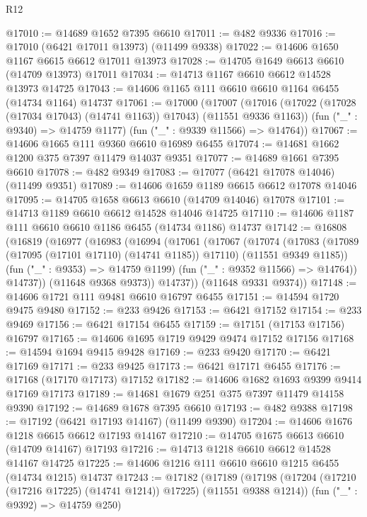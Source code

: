 \begin{lexlean}{R12}
\begin{coremodule}
@17010 := @14689 @1652 @7395 @6610
@17011 := @482 @9336
@17016 := @17010 (@6421 @17011 @13973) (@11499 @9338)
@17022 := @14606 @1650 @1167 @6615 @6612 @17011 @13973
@17028 := @14705 @1649 @6613 @6610 (@14709 @13973) @17011
@17034 := @14713 @1167 @6610 @6612 @14528 @13973 @14725
@17043 := @14606 @1165 @111 @6610 @6610 @1164 @6455 (@14734 @1164) @14737
@17061 := @17000
    (@17007
      (@17016 (@17022 (@17028 (@17034 @17043) (@14741 @1163)) @17043) (@11551 @9336 @1163))
      (fun ("_" : @9340) => @14759 @1177)
      (fun ("_" : @9339 @11566) => @14764))
@17067 := @14606 @1665 @111 @9360 @6610 @16989 @6455
@17074 := @14681 @1662 @1200 @375 @7397 @11479 @14037 @9351
@17077 := @14689 @1661 @7395 @6610
@17078 := @482 @9349
@17083 := @17077 (@6421 @17078 @14046) (@11499 @9351)
@17089 := @14606 @1659 @1189 @6615 @6612 @17078 @14046
@17095 := @14705 @1658 @6613 @6610 (@14709 @14046) @17078
@17101 := @14713 @1189 @6610 @6612 @14528 @14046 @14725
@17110 := @14606 @1187 @111 @6610 @6610 @1186 @6455 (@14734 @1186) @14737
@17142 := @16808
    (@16819
      (@16977
        (@16983
          (@16994
            (@17061
              (@17067
                (@17074
                  (@17083
                    (@17089 (@17095 (@17101 @17110) (@14741 @1185)) @17110)
                    (@11551 @9349 @1185))
                  (fun ("_" : @9353) => @14759 @1199)
                  (fun ("_" : @9352 @11566) => @14764))
                @14737))
            (@11648 @9368 @9373))
          @14737))
      (@11648 @9331 @9374))
@17148 := @14606 @1721 @111 @9481 @6610 @16797 @6455
@17151 := @14594 @1720 @9475 @9480
@17152 := @233 @9426
@17153 := @6421 @17152
@17154 := @233 @9469
@17156 := @6421 @17154 @6455
@17159 := @17151 (@17153 @17156) @16797
@17165 := @14606 @1695 @1719 @9429 @9474 @17152 @17156
@17168 := @14594 @1694 @9415 @9428
@17169 := @233 @9420
@17170 := @6421 @17169
@17171 := @233 @9425
@17173 := @6421 @17171 @6455
@17176 := @17168 (@17170 @17173) @17152
@17182 := @14606 @1682 @1693 @9399 @9414 @17169 @17173
@17189 := @14681 @1679 @251 @375 @7397 @11479 @14158 @9390
@17192 := @14689 @1678 @7395 @6610
@17193 := @482 @9388
@17198 := @17192 (@6421 @17193 @14167) (@11499 @9390)
@17204 := @14606 @1676 @1218 @6615 @6612 @17193 @14167
@17210 := @14705 @1675 @6613 @6610 (@14709 @14167) @17193
@17216 := @14713 @1218 @6610 @6612 @14528 @14167 @14725
@17225 := @14606 @1216 @111 @6610 @6610 @1215 @6455 (@14734 @1215) @14737
@17243 := @17182
    (@17189
      (@17198 (@17204 (@17210 (@17216 @17225) (@14741 @1214)) @17225) (@11551 @9388 @1214))
      (fun ("_" : @9392) => @14759 @250)

\end{coremodule}
\end{lexlean}
